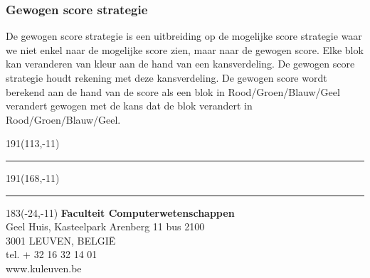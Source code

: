 \documentclass[12pt,a4paper,oneside]{book}
\theoremstyle{definition}
\begin{document}
\subsubsection{Gewogen score strategie}
De gewogen score strategie is een uitbreiding op de mogelijke score strategie waar we niet enkel naar de mogelijke score zien, maar naar de gewogen score. Elke blok kan veranderen van kleur aan de hand van een kansverdeling. De gewogen score strategie houdt rekening met deze kansverdeling. De gewogen score wordt berekend aan de hand van de score als een blok in Rood/Groen/Blauw/Geel verandert gewogen met de kans dat de blok verandert in Rood/Groen/Blauw/Geel.




\newpage
\thispagestyle{empty}
\sffamily
%
\begin{textblock}{191}(113,-11)
{\color{blueline}\rule{160pt}{5.5pt}}
\end{textblock}
%
\begin{textblock}{191}(168,-11)
{\color{blueline}\rule{5.5pt}{59pt}}
\end{textblock}
%
\begin{textblock}{183}(-24,-11)
\textblockcolour{}
\flushright
\fontsize{7}{7.5}\selectfont
\textbf{Faculteit Computerwetenschappen}\\
Geel Huis, Kasteelpark Arenberg 11 bus 2100\\
3001 LEUVEN, BELGI\"{E}\\
tel. + 32 16 32 14 01\\
www.kuleuven.be\\
\end{textblock}
%
\end{document}
